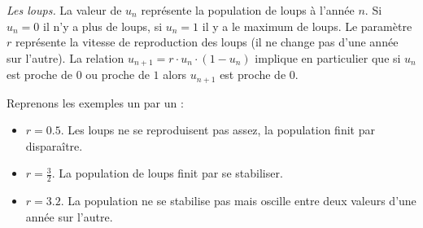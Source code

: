 \documentclass[11pt,class=report,crop=false]{standalone}
\begin{document}
\begin{cours}
\bigskip


\emph{Les loups.}
La valeur de $u_n$ représente la population de loups à l'année $n$. Si $u_n=0$ il n'y a plus de loups, si $u_n=1$ il y a le maximum de loups. Le paramètre $r$ représente la vitesse de reproduction des loups (il ne change pas d'une année sur l'autre). La relation $u_{n+1} = r \cdot u_n \cdot (1-u_n)$ implique en particulier que si $u_n$ est proche de $0$ ou proche de $1$ alors $u_{n+1}$ est proche de $0$.

Reprenons les exemples un par un :
\begin{itemize}
  \item $r=0.5$. Les loups ne se reproduisent pas assez, la population finit par disparaître.
  \item $r=\frac32$. La population de loups finit par se stabiliser.
  \item $r=3.2$. La population ne se stabilise pas mais oscille entre deux valeurs d'une année sur l'autre.  
\end{itemize}

\end{cours}
\end{document}
